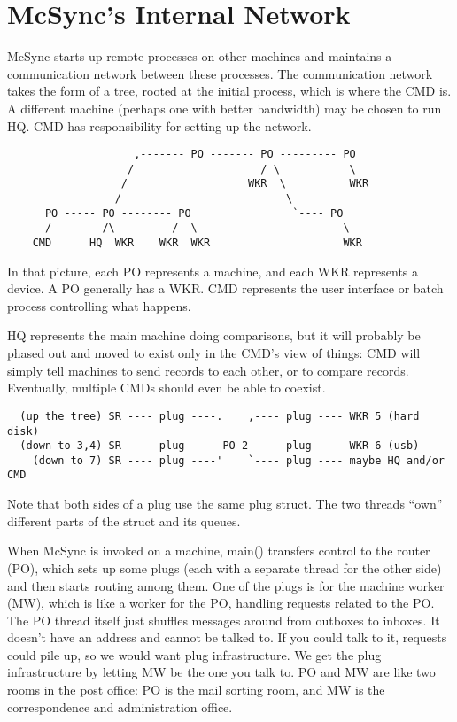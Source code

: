 \documentclass{book}
\begin{document}
\section{McSync's Internal Network}

McSync starts up remote processes on other machines and maintains a communication network between these processes.  The communication network takes the form of a tree, rooted at the initial process, which is where the CMD is.  A different machine (perhaps one with better bandwidth) may be chosen to run HQ.  CMD has responsibility for setting up the network.


\begin{verbatim}
                    ,------- PO ------- PO --------- PO
                   /                    / \           \
                  /                   WKR  \          WKR
                 /                          \
      PO ----- PO -------- PO                `---- PO
      /        /\         /  \                       \
    CMD      HQ  WKR    WKR  WKR                     WKR
\end{verbatim}

In that picture, each PO represents a machine, and each WKR represents a device.
A PO generally has a WKR.
CMD represents the user interface or batch process controlling what happens.

HQ represents the main machine doing comparisons,
but it will probably be phased out and moved to exist only in the CMD's view of things:
CMD will simply tell machines to send records to each other, or to compare records.
Eventually, multiple CMDs should even be able to coexist.

\begin{verbatim}
  (up the tree) SR ---- plug ----.    ,---- plug ---- WKR 5 (hard disk)
  (down to 3,4) SR ---- plug ---- PO 2 ---- plug ---- WKR 6 (usb)
    (down to 7) SR ---- plug ----'    `---- plug ---- maybe HQ and/or CMD
\end{verbatim}

Note that both sides of a plug use the same plug struct.  The two threads ``own'' different parts of the struct and its queues.

When McSync is invoked on a machine, main() transfers control to the router (PO), which sets up some plugs (each with a separate thread for the other side) and then starts routing among them.
One of the plugs is for the machine worker (MW), which is like a worker for the PO,
handling requests related to the PO.
The PO thread itself just shuffles messages around from outboxes to inboxes.
It doesn't have an address and cannot be talked to.
If you could talk to it, requests could pile up, so we would want plug infrastructure.
We get the plug infrastructure by letting MW be the one you talk to.
PO and MW are like two rooms in the post office:
PO is the mail sorting room,
and MW is the correspondence and administration office.
\end{document}

